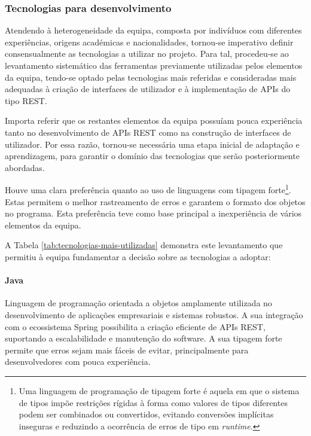 \subsubsection{Tecnologias para desenvolvimento}

Atendendo à heterogeneidade da equipa, composta por indivíduos com diferentes experiências, origens académicas e nacionalidades, tornou-se imperativo definir consensualmente as tecnologias a utilizar no projeto. Para tal, procedeu-se ao levantamento sistemático das ferramentas previamente utilizadas pelos elementos da equipa, tendo-se optado pelas tecnologias mais referidas e consideradas mais adequadas à criação de interfaces de utilizador e à implementação de APIs do tipo REST. 

Importa referir que os restantes elementos da equipa possuíam pouca experiência tanto no desenvolvimento de APIs REST como na construção de interfaces de utilizador. Por essa razão, tornou-se necessária uma etapa inicial de adaptação e aprendizagem, para garantir o domínio das tecnologias que serão posteriormente abordadas.

Houve uma clara preferência quanto ao uso de linguagens com tipagem forte\footnote{Uma linguagem de programação de tipagem forte é aquela em que o sistema de tipos impõe restrições rígidas à forma como valores de tipos diferentes podem ser combinados ou convertidos, evitando conversões implícitas inseguras e reduzindo a ocorrência de erros de tipo em \textit{runtime}.}. Estas permitem o melhor rastreamento de erros e garantem o formato dos objetos no programa. Esta preferência teve como base principal a inexperiência de vários elementos da equipa.

A Tabela \ref{tab:tecnologias-mais-utilizadas} demonstra este levantamento que permitiu à equipa fundamentar a decisão sobre as tecnologias a adoptar:



\pagebreak

\paragraph{Java} Linguagem de programação orientada a objetos amplamente utilizada no desenvolvimento de aplicações empresariais e sistemas robustos. A sua integração com o ecossistema Spring possibilita a criação eficiente de APIs REST, suportando a escalabilidade e manutenção do software. A sua tipagem forte permite que erros sejam mais fáceis de evitar, principalmente para desenvolvedores com pouca experiência.  

